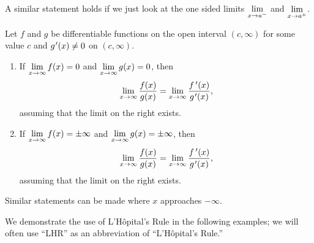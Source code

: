 A similar statement holds if we just look at the one sided limits $\displaystyle\lim_{x\to a^-}$ and $\displaystyle\lim_{x\to a^+}$.

\begin{theorem}\label{thm:LHR_2}%
Let $f$ and $g$ be differentiable functions on the open interval $(c,\infty)$ for some value $c$ and $g\primeskip'(x)\neq0$ on $(c,\infty)$.
\begin{enumerate}
\item If $\displaystyle\lim_{x\to\infty}f(x)=0$ and $\displaystyle\lim_{x\to \infty}g(x)=0$, then
\[\lim_{x\to\infty}\frac{f(x)}{g(x)}=\lim_{x\to\infty}\frac{\fp(x)}{g\primeskip'(x)},\]
assuming that the limit on the right exists.
\item If  $\displaystyle\lim_{x\to \infty}f(x)=\pm\infty$ and $\displaystyle\lim_{x\to \infty}g(x)=\pm\infty$, then
\[\lim_{x\to\infty}\frac{f(x)}{g(x)}=\lim_{x\to\infty}\frac{\fp(x)}{g\primeskip'(x)},\]
assuming that the limit on the right exists.
\end{enumerate}
Similar statements can be made where $x$ approaches $-\infty$.
\end{theorem}

We demonstrate the use of L'Hôpital's Rule in the following examples; we will often use ``LHR'' as an abbreviation of ``L'Hôpital's Rule.''

